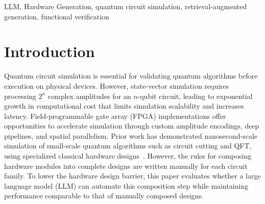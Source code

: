 \documentclass[conference]{IEEEtran}
\begin{document}
\begin{abstract}
\end{abstract}


\begin{IEEEkeywords}
LLM, Hardware Generation,
quantum circuit simulation, retrieval-augmented generation,
functional verification
\end{IEEEkeywords}

\section{Introduction}
\label{sec:intro}
Quantum circuit simulation is essential for validating quantum algorithms before execution on physical devices. However, state-vector simulation requires
processing $2^n$ complex amplitudes for an $n$-qubit circuit, leading to
exponential growth in computational cost that limits
simulation scalability and increases latency\cite{ali2026fpga,cicero2025simulation}.
Field-programmable gate array (FPGA) implementations offer opportunities
to accelerate simulation through custom amplitude encodings, deep
pipelines, and spatial parallelism. Prior work has demonstrated
nanosecond-scale simulation of small-scale quantum algorithms such as circuit cutting and QFT, using specialized classical hardware designs~\cite{isqed2026,hpdc26,TurnerICDM2025}.
However, the rules for composing hardware modules into complete designs are written manually for each circuit family. To lower
the hardware design barrier, this paper evaluates whether a large language model (LLM) can automate this composition step while maintaining performance comparable to that of manually composed designs.
\end{document}
